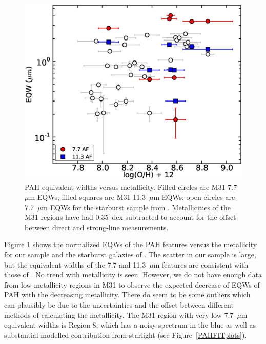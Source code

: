 \begin{figure}
\centering
\includegraphics[scale=0.27]{./fig12.eps}
\caption{ PAH equivalent widths versus metallicity. 
Filled circles are M31 7.7~$\mu$m EQWs; filled squares are M31 11.3~$\mu$m EQWs; 
open circles are 7.7~$\mu$m EQWs for the starburst sample from \citet{Engelbracht_2008}.
Metallicities of the M31 regions have had 0.35~dex subtracted to account for the offset  between direct and strong-line measurements. 
}
\label{metalicityVseqw}
\end{figure}

Figure \ref{metalicityVseqw} shows the normalized EQWs of the PAH features  versus the metallicity for our sample and the starburst 
galaxies of \citet{Engelbracht_2008}. The scatter in our sample is large, but the 	
equivalent widths of the 7.7 and 11.3~$\mu$m features are consistent with those of \citet{Engelbracht_2008}. 
No trend with metallicity is seen.
However, we do not have enough data from low-metallicity regions in M31 to observe the expected decrease of EQWs of PAH with the decreasing 
metallicity.  There do seem to be some outliers which can plausibly be due to the uncertainties  and the offset between different methods of calculating the metallicity.  
The M31 region with very low  7.7~$\mu$m  equivalent widths is Region 8, which has
a noisy spectrum in the blue as well as substantial modelled contribution from starlight (see Figure~\ref{PAHFITplots}).

